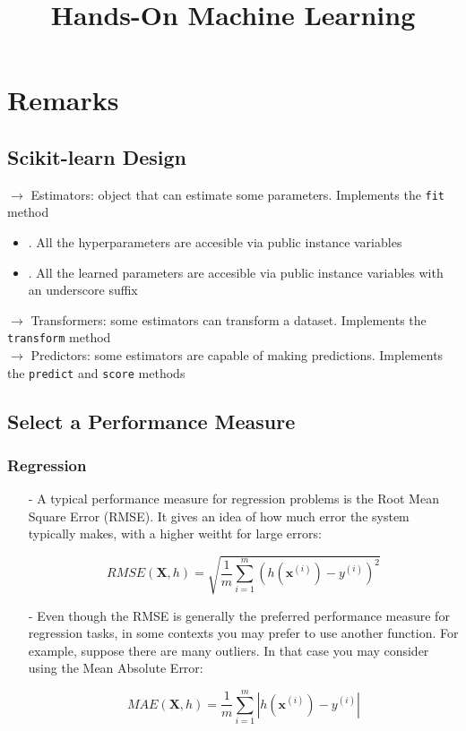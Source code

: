 \documentclass[french]{article}
\title{Hands-On Machine Learning}
\begin{document}
\tableofcontents
\date{}

\maketitle

\setlength{\parindent}{0cm}

\section{Remarks}

\subsection{Scikit-learn Design}

$\rightarrow$ Estimators: object that can estimate some parameters. Implements the \lstinline{fit} method
\begin{itemize}
    \item[.] All the hyperparameters are accesible via public instance variables
    \item[.] All the learned parameters are accesible via public instance variables with an underscore suffix
\end{itemize}
$\rightarrow$ Transformers: some estimators can transform a dataset. Implements the \lstinline{transform} method\\
$\rightarrow$ Predictors: some estimators are capable of making predictions. Implements the \lstinline{predict} and \lstinline{score} methods

\subsection{Select a Performance Measure}

\subsubsection{Regression}

\begin{itemize}

\item[-] A typical performance measure for regression problems is the Root Mean Square Error (RMSE). It gives an idea of how much error the system typically makes, with a higher weitht for large errors:

\[RMSE(\bm{X}, h) = \sqrt{\frac{1}{m} \sum_{i=1}^m(h(\bm{x}^{(i)}) - y^{(i)})^2}\]

\item[-] Even though the RMSE is generally the preferred performance measure for regression tasks, in some contexts you may prefer to use another function. For example, suppose there are many outliers. In that case you may consider using the Mean Absolute Error:

\[MAE(\bm{X}, h) = \frac{1}{m} \sum_{i=1}^m |h(\bm{x}^{(i)}) - y^{(i)}|\]

\end{itemize}
\end{document}
